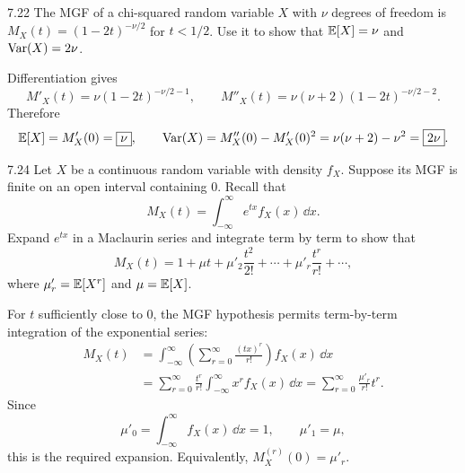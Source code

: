 \documentclass[11pt,oneside]{article}
\begin{document}
\begin{exercise}{7.22}
The MGF of a chi-squared random variable $X$ with $\nu$ degrees of freedom is $M_X(t)=(1-2t)^{-\nu/2}$ for $t<1/2$. Use it to show that $\mathbb{E}[X]=\nu$ and $\operatorname{Var}(X)=2\nu$.
\end{exercise}
\begin{solution}
Differentiation gives
\[
M'_X(t)=\nu(1-2t)^{-\nu/2-1}, \qquad
M''_X(t)=\nu(\nu+2)(1-2t)^{-\nu/2-2}.
\]
Therefore
\[
\mathbb{E}[X]=M'_X(0)=\boxed{\nu}, \qquad
\operatorname{Var}(X)=M''_X(0)-M'_X(0)^2
=\nu(\nu+2)-\nu^2=\boxed{2\nu}.
\]
\end{solution}

\begin{exercise}{7.24}
Let $X$ be a continuous random variable with density $f_X$. Suppose its MGF is finite on an open interval containing $0$. Recall that
\[
M_X(t)=\int_{-\infty}^{\infty}e^{tx}f_X(x)\,\dd x.
\]
Expand $e^{tx}$ in a Maclaurin series and integrate term by term to show that
\[
M_X(t)=1+\mu t+\mu'_2\frac{t^2}{2!}+\cdots+\mu'_r\frac{t^r}{r!}+\cdots,
\]
where $\mu'_r=\mathbb{E}[X^r]$ and $\mu=\mathbb{E}[X]$.
\end{exercise}
\begin{solution}
For $t$ sufficiently close to $0$, the MGF hypothesis permits term-by-term integration of the exponential series:
\[
\begin{aligned}
M_X(t)
&=\int_{-\infty}^{\infty}\left(\sum_{r=0}^\infty\frac{(tx)^r}{r!}\right)f_X(x)\,\dd x\\
&=\sum_{r=0}^\infty\frac{t^r}{r!}
\int_{-\infty}^{\infty}x^rf_X(x)\,\dd x
=\sum_{r=0}^\infty\frac{\mu'_r}{r!}t^r.
\end{aligned}
\]
Since
\[
\mu'_0=\int_{-\infty}^{\infty}f_X(x)\,\dd x=1,\qquad\mu'_1=\mu,
\]
this is the required expansion. Equivalently, $M_X^{(r)}(0)=\mu'_r$.
\end{solution}
\end{document}

